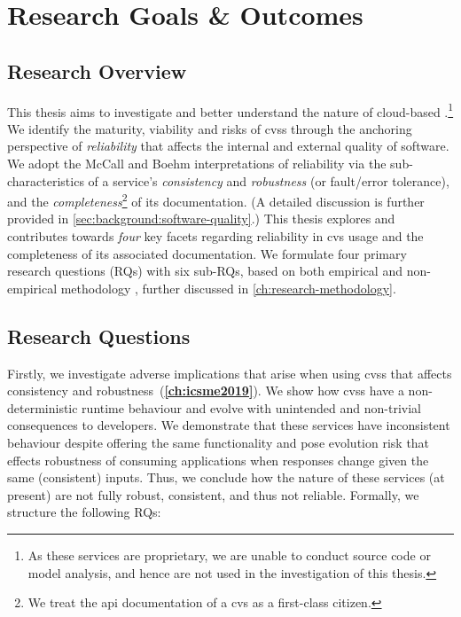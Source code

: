 \section{Research Goals \& Outcomes}
\label{sec:introduction:hypohtesis}

\subsection{Research Overview}


This thesis aims to investigate and better understand the nature of cloud-based .\footnote{As these services are proprietary, we are unable to conduct source code or model analysis, and hence are not used in the investigation of this thesis.} 
We identify the maturity, viability and risks of \glspl{cvs} through the anchoring perspective of \textit{reliability} that affects the internal and external quality of software. We adopt the McCall \citep{McCall:1977uy} and Boehm \citep{Boehm:1978vv} interpretations of reliability via the sub-characteristics of a service's \textit{consistency} and \textit{robustness} (or fault/error tolerance), and the \textit{completeness}\footnote{We treat the \gls{api} documentation of a \gls{cvs} as a first-class citizen.} of its documentation. (A detailed discussion is further provided in \cref{sec:background:software-quality}.)
This thesis explores and contributes towards \textit{four} key facets regarding reliability in \gls{cvs} usage and the completeness of its associated documentation. We formulate four primary research questions (RQs) with six sub-RQs, based on both empirical and non-empirical  methodology \citep{Shull:2007vh,Simon:1996uw}, further discussed in \cref{ch:research-methodology}.

\subsection{Research Questions}

Firstly, we investigate adverse implications that arise when using \glspl{cvs} that affects consistency and robustness~(\textbf{\cref{ch:icsme2019}}). We show how \glspl{cvs} have a non-deterministic runtime behaviour and evolve with unintended and non-trivial consequences to developers. We demonstrate that these services have inconsistent behaviour despite offering the same functionality and pose evolution risk that effects robustness of consuming applications when responses change given the same (consistent) inputs. Thus, we conclude how the nature of these services (at present) are not fully robust, consistent, and thus not reliable. Formally, we structure the following RQs:

